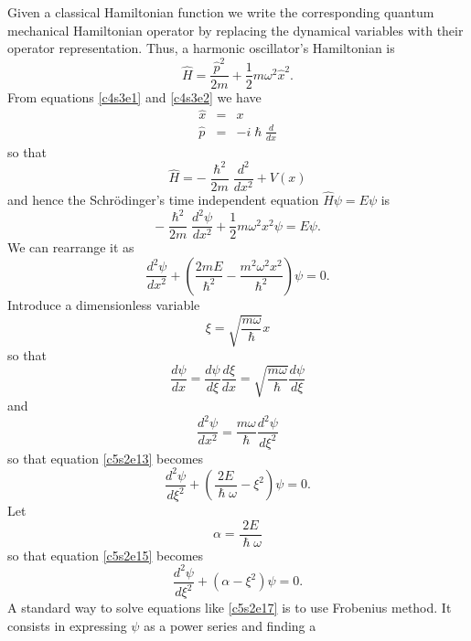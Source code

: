 Given a classical Hamiltonian function we write the corresponding quantum
mechanical Hamiltonian operator by replacing the dynamical variables with their
operator representation. Thus, a harmonic oscillator's Hamiltonian is
\begin{equation}\label{c5s2e8}
\hat{H} = \frac{\hat{p}^2}{2m} + \frac{1}{2}m\omega^2\hat{x}^2.
\end{equation}
From equations \eqref{c4s3e1} and \eqref{c4s3e2} we have
\begin{eqnarray}
\hat{x} &=& x \label{c5s2e9} \\
\hat{p} &=& -i\hslash\frac{d}{dx} \label{c5s2e10}
\end{eqnarray}
so that
\begin{equation}\label{c5s2e11}
\hat{H} = -\frac{\hslash^2}{2m}\frac{d^2}{dx^2} + V(x)
\end{equation}
and hence the Schr\"{o}dinger's time independent equation $\hat{H}\psi = E\psi$
is
\begin{equation}\label{c5s2e12}
-\frac{\hslash^2}{2m}\frac{d^2\psi}{dx^2} + \frac{1}{2}m\omega^2x^2\psi = E\psi.
\end{equation}
We can rearrange it as
\begin{equation}\label{c5s2e13}
\frac{d^2\psi}{dx^2} + \left(\frac{2mE}{\hslash^2} - \frac{m^2\omega^2x^2}{\hslash^2}\right)\psi = 0.
\end{equation}
Introduce a dimensionless variable
\begin{equation}\label{c5s2e14}
\xi = \sqrt{\frac{m\omega}{\hslash}}x
\end{equation}
so that
\[
\frac{d\psi}{dx} = \frac{d\psi}{d\xi}\frac{d\xi}{dx} = \sqrt{\frac{m\omega}{\hslash}}\frac{d\psi}{d\xi}
\]
and
\[
\frac{d^2\psi}{dx^2} = \frac{m\omega}{\hslash}\frac{d^2\psi}{d\xi^2}
\]
so that equation \eqref{c5s2e13} becomes
\begin{equation}\label{c5s2e15}
\frac{d^2\psi}{d\xi^2} + \left(\frac{2E}{\hslash\omega} - \xi^2\right)\psi = 0.
\end{equation}
Let
\begin{equation}\label{c5s2e16}
\alpha = \frac{2E}{\hslash\omega}
\end{equation}
so that equation \eqref{c5s2e15} becomes
\begin{equation}\label{c5s2e17}
\frac{d^2\psi}{d\xi^2} + (\alpha - \xi^2)\psi = 0.
\end{equation}
A standard way to solve equations like \eqref{c5s2e17} is to use Frobenius 
method. It consists in expressing $\psi$ as a power series and finding a 
